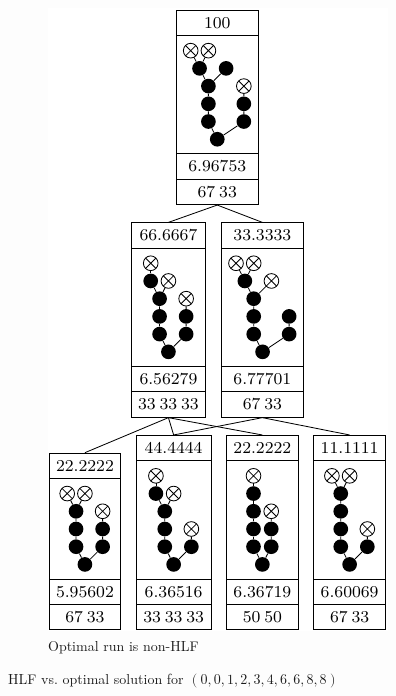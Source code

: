 \begin{figure}[ht]
\begin{subfigure}{.45\linewidth}
    \includegraphics{p3/hlf_not_optimal/0012346688_opt.pdf}
    \caption{Optimal run is non-HLF}
  \end{subfigure}
  \caption{HLF vs. optimal solution for $(0,0,1,2,3,4,6,6,8,8)$}
  \label{fig:hlf-vs-opt-0012346688}
\end{figure}

